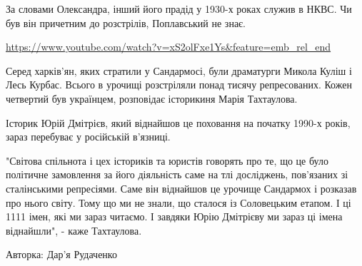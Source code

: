 За словами Олександра, інший його прадід у 1930-х роках служив в НКВС. Чи був
він причетним до розстрілів, Поплавський не знає.
 
\url{https://www.youtube.com/watch?v=xS2olFxe1Ys&feature=emb_rel_end}

Серед харків'ян, яких стратили у Сандармосі, були драматурги Микола Куліш і
Лесь Курбас. Всього в урочищі розстріляли понад тисячу репресованих. Кожен
четвертий був українцем, розповідає історикиня Марія Тахтаулова.

Історик Юрій Дмітрієв, який віднайшов це поховання на початку 1990-х років,
зараз перебуває у російській в'язниці.

"Світова спільнота і цех істориків та юристів говорять про те, що це було
політичне замовлення за його діяльність саме на тлі досліджень, пов'язаних зі
сталінськими репресіями. Саме він віднайшов це урочище Сандармох і розказав про
нього світу. Тому що ми не знали, що сталося із Соловецьким етапом. І ці 1111
імен, які ми зараз читаємо. І завдяки Юрію Дмітрієву ми зараз ці імена
віднайшли", - каже Тахтаулова.

Авторка: Дар'я Рудаченко
